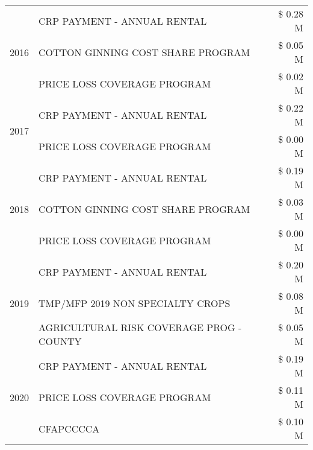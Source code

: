 \begin{tabular}{llr}
\multirow[t]{3}{*}{2016} & CRP PAYMENT - ANNUAL RENTAL & \$ 0.28 M \\
 & COTTON GINNING COST SHARE PROGRAM & \$ 0.05 M \\
 & PRICE LOSS COVERAGE PROGRAM & \$ 0.02 M \\
\cline{1-3}
\multirow[t]{2}{*}{2017} & CRP PAYMENT - ANNUAL RENTAL & \$ 0.22 M \\
 & PRICE LOSS COVERAGE PROGRAM & \$ 0.00 M \\
\cline{1-3}
\multirow[t]{3}{*}{2018} & CRP PAYMENT - ANNUAL RENTAL & \$ 0.19 M \\
 & COTTON GINNING COST SHARE PROGRAM & \$ 0.03 M \\
 & PRICE LOSS COVERAGE PROGRAM & \$ 0.00 M \\
\cline{1-3}
\multirow[t]{3}{*}{2019} & CRP PAYMENT - ANNUAL RENTAL & \$ 0.20 M \\
 & TMP/MFP 2019 NON SPECIALTY CROPS & \$ 0.08 M \\
 & AGRICULTURAL RISK COVERAGE PROG - COUNTY & \$ 0.05 M \\
\cline{1-3}
\multirow[t]{3}{*}{2020} & CRP PAYMENT - ANNUAL RENTAL & \$ 0.19 M \\
 & PRICE LOSS COVERAGE PROGRAM & \$ 0.11 M \\
 & CFAPCCCCA & \$ 0.10 M \\
\cline{1-3}
\bottomrule
\end{tabular}
